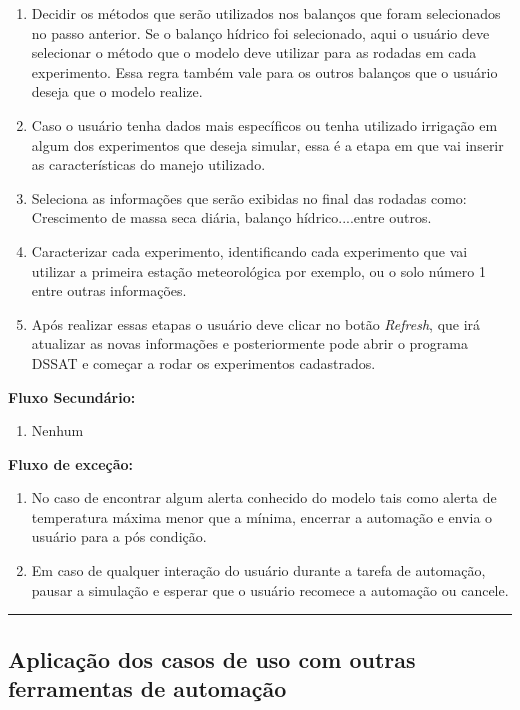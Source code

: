\documentclass[tg]{mdtufsm}
\begin{document}
\begin{enumerate}
		\item Decidir os métodos que serão utilizados nos balanços que foram selecionados no passo anterior. Se o balanço hídrico foi selecionado, aqui o usuário deve selecionar o método que o modelo deve utilizar para as rodadas em cada experimento. Essa regra também vale para os outros balanços que o usuário deseja que o modelo realize.
		\item Caso o usuário tenha dados mais específicos ou tenha utilizado irrigação em algum dos experimentos que deseja simular, essa é a etapa em que vai inserir as características do manejo utilizado. 
		\item Seleciona as informações que serão exibidas no final das rodadas como: Crescimento de massa seca diária, balanço hídrico....entre outros.
		\item Caracterizar cada experimento, identificando cada experimento que vai utilizar a primeira estação meteorológica por exemplo, ou o solo número 1 entre outras informações.
		\item Após realizar essas etapas o usuário deve clicar no botão \emph{Refresh}, que irá atualizar as novas informações e posteriormente pode abrir o programa DSSAT e começar a rodar os experimentos cadastrados.
	\end{enumerate}
	
	{\bf Fluxo Secundário:}
	
	\begin{enumerate}
		\item Nenhum
	\end{enumerate}
		
	{\bf Fluxo de exceção:}
	
	\begin{enumerate}
		\item No caso de encontrar algum alerta conhecido do modelo tais como alerta de temperatura máxima menor que a mínima, encerrar a automação e envia o usuário para a pós condição.
		\item Em caso de qualquer interação do usuário durante a tarefa de automação, pausar a simulação e esperar que o usuário recomece a automação ou cancele.
	\end{enumerate}
	
	\bigskip \hrule \bigskip
	
	\subsection {Aplicação dos casos de uso com outras ferramentas de automação}
\end{document}

